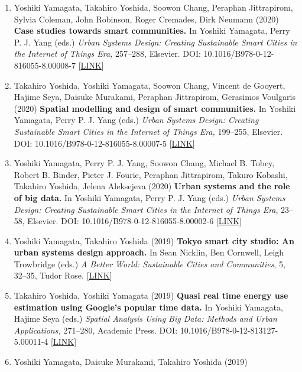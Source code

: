\documentclass[]{book}
\begin{document}
\begin{enumerate}
\item
  Yoshiki Yamagata, Takahiro Yoshida, Soowon Chang, Peraphan Jittrapirom, Sylvia Coleman, John Robinson, Roger Cremades, Dirk Neumann (2020)
  \textbf{Case studies towards smart communities.}
  In Yoshiki Yamagata, Perry P. J. Yang (eds.)
  \emph{Urban Systems Design: Creating Sustainable Smart Cities in the Internet of Things Era,} 257--288, Elsevier.
  DOI: 10.1016/B978-0-12-816055-8.00008-7 {[}\href{https://www.elsevier.com/books/urban-systems-design/yamagata/978-0-12-816055-8}{LINK}{]}
\item
  Takahiro Yoshida, Yoshiki Yamagata, Soowon Chang, Vincent de Gooyert, Hajime Seya, Daisuke Murakami, Peraphan Jittrapirom, Gerasimos Voulgaris (2020)
  \textbf{Spatial modelling and design of smart communities.}
  In Yoshiki Yamagata, Perry P. J. Yang (eds.)
  \emph{Urban Systems Design: Creating Sustainable Smart Cities in the Internet of Things Era,} 199--255, Elsevier.
  DOI: 10.1016/B978-0-12-816055-8.00007-5 {[}\href{https://www.elsevier.com/books/urban-systems-design/yamagata/978-0-12-816055-8}{LINK}{]}
\item
  Yoshiki Yamagata, Perry P. J. Yang, Soowon Chang, Michael B. Tobey, Robert B. Binder, Pieter J. Fourie, Peraphan Jittrapirom, Takuro Kobashi, Takahiro Yoshida, Jelena Aleksejeva (2020)
  \textbf{Urban systems and the role of big data.}
  In Yoshiki Yamagata, Perry P. J. Yang (eds.)
  \emph{Urban Systems Design: Creating Sustainable Smart Cities in the Internet of Things Era}, 23--58, Elsevier.
  DOI: 10.1016/B978-0-12-816055-8.00002-6 {[}\href{https://www.elsevier.com/books/urban-systems-design/yamagata/978-0-12-816055-8}{LINK}{]}
\item
  Yoshiki Yamagata, Takahiro Yoshida (2019)
  \textbf{Tokyo smart city studio: An urban systems design approach.}
  In Sean Nicklin, Ben Cornwell, Leigh Trowbridge (eds.)
  \emph{A Better World: Sustainable Cities and Communities}, 5, 32--35, Tudor Rose.
  {[}\href{http://unhabitat.org.mm/publications/a-better-world-volume-5/}{LINK}{]}
\item
  Takahiro Yoshida, Yoshiki Yamagata (2019)
  \textbf{Quasi real time energy use estimation using Google's popular time data.}
  In Yoshiki Yamagata, Hajime Seya (eds.)
  \emph{Spatial Analysis Using Big Data: Methods and Urban Applications,} 271--280, Academic Press.
  DOI: 10.1016/B978-0-12-813127-5.00011-4 {[}\href{https://www.elsevier.com/books/spatial-analysis-using-big-data/yamagata/978-0-12-813127-5}{LINK}{]}
\item
  Yoshiki Yamagata, Daisuke Murakami, Takahiro Yoshida (2019)

\end{enumerate}
\end{document}
